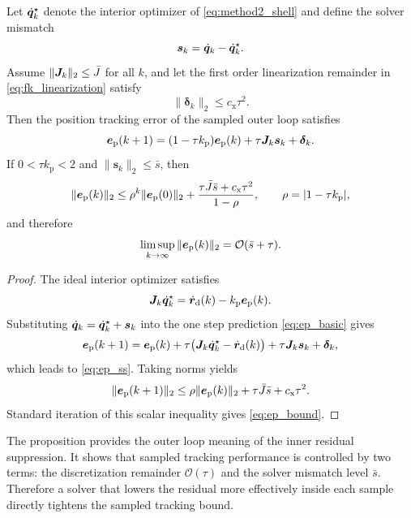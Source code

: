 \begin{proposition}
Let $\dot{\bm{q}}_k^\star$ denote the interior optimizer of \eqref{eq:method2_shell} and define the solver mismatch
\begin{equation}
  \bm{s}_k = \dot{\bm{q}}_k - \dot{\bm{q}}_k^\star.
\end{equation}
Assume $\|\bm{J}_k\|_2 \le \bar J$ for all $k$, and let the first order linearization remainder in \eqref{eq:fk_linearization} satisfy
\begin{equation}
  \|\bm{\delta}_k\|_2 \le c_{\mathrm{x}}\tau^2.
\end{equation}
Then the position tracking error of the sampled outer loop satisfies
\begin{equation}
  \bm{e}_{\mathrm{p}}(k+1)
  =
  (1-\tau k_{\mathrm{p}})\bm{e}_{\mathrm{p}}(k)
  +
  \tau \bm{J}_k \bm{s}_k
  +
  \bm{\delta}_k.
  \label{eq:ep_ss}
\end{equation}
If $0 < \tau k_{\mathrm{p}} < 2$ and $\|\bm{s}_k\|_2 \le \bar s$, then
\begin{equation}
  \|\bm{e}_{\mathrm{p}}(k)\|_2
  \le
  \rho^k \|\bm{e}_{\mathrm{p}}(0)\|_2
  +
  \frac{\tau \bar J \bar s + c_{\mathrm{x}}\tau^2}{1-\rho},
  \qquad
  \rho = |1-\tau k_{\mathrm{p}}|,
  \label{eq:ep_bound}
\end{equation}
and therefore
\begin{equation}
  \limsup_{k\to\infty}\|\bm{e}_{\mathrm{p}}(k)\|_2
  =
  \mathcal{O}(\bar s + \tau).
\end{equation}
\end{proposition}

\begin{proof}
The ideal interior optimizer satisfies
\begin{equation}
  \bm{J}_k \dot{\bm{q}}_k^\star = \dot{\bm{r}}_{\mathrm{d}}(k) - k_{\mathrm{p}}\bm{e}_{\mathrm{p}}(k).
\end{equation}
Substituting $\dot{\bm{q}}_k = \dot{\bm{q}}_k^\star + \bm{s}_k$ into the one step prediction \eqref{eq:ep_basic} gives
\begin{equation}
  \bm{e}_{\mathrm{p}}(k+1)
  =
  \bm{e}_{\mathrm{p}}(k)
  + \tau\bigl(\bm{J}_k \dot{\bm{q}}_k^\star - \dot{\bm{r}}_{\mathrm{d}}(k)\bigr)
  + \tau \bm{J}_k \bm{s}_k
  + \bm{\delta}_k,
\end{equation}
which leads to \eqref{eq:ep_ss}. Taking norms yields
\begin{equation}
  \|\bm{e}_{\mathrm{p}}(k+1)\|_2
  \le
  \rho \|\bm{e}_{\mathrm{p}}(k)\|_2
  +
  \tau \bar J \bar s
  +
  c_{\mathrm{x}}\tau^2.
\end{equation}
Standard iteration of this scalar inequality gives \eqref{eq:ep_bound}.
\end{proof}

The proposition provides the outer loop meaning of the inner residual suppression. It shows that sampled tracking performance is controlled by two terms: the discretization remainder $\mathcal{O}(\tau)$ and the solver mismatch level $\bar s$. Therefore a solver that lowers the residual more effectively inside each sample directly tightens the sampled tracking bound.

